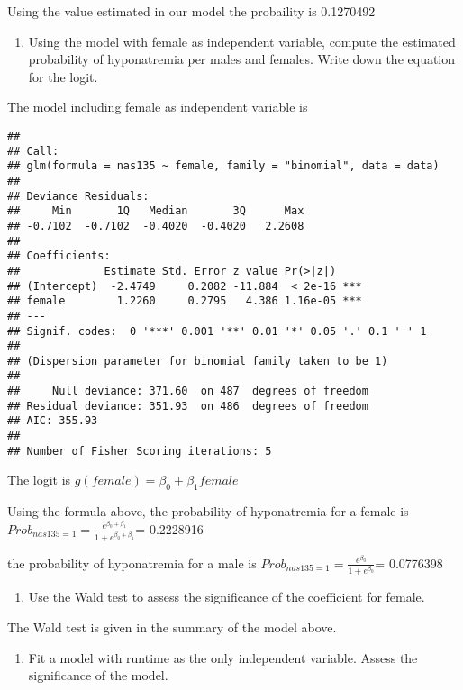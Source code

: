 \documentclass[]{article}
\begin{document}
Using the value estimated in our model the probaility is 0.1270492

\begin{enumerate}
\def\labelenumi{\alph{enumi}.}
\setcounter{enumi}{4}
\itemsep1pt\parskip0pt
\item
  Using the model with female as independent variable, compute the
  estimated probability of hyponatremia per males and females. Write
  down the equation for the logit.
\end{enumerate}

The model including female as independent variable is

\begin{verbatim}
## 
## Call:
## glm(formula = nas135 ~ female, family = "binomial", data = data)
## 
## Deviance Residuals: 
##     Min       1Q   Median       3Q      Max  
## -0.7102  -0.7102  -0.4020  -0.4020   2.2608  
## 
## Coefficients:
##             Estimate Std. Error z value Pr(>|z|)    
## (Intercept)  -2.4749     0.2082 -11.884  < 2e-16 ***
## female        1.2260     0.2795   4.386 1.16e-05 ***
## ---
## Signif. codes:  0 '***' 0.001 '**' 0.01 '*' 0.05 '.' 0.1 ' ' 1
## 
## (Dispersion parameter for binomial family taken to be 1)
## 
##     Null deviance: 371.60  on 487  degrees of freedom
## Residual deviance: 351.93  on 486  degrees of freedom
## AIC: 355.93
## 
## Number of Fisher Scoring iterations: 5
\end{verbatim}

The logit is $g(female)=\beta_0+\beta_1female$

Using the formula above, the probability of hyponatremia for a female is
$Prob_{nas135=1}=\frac{e^{\beta_0+\beta_1}}{1+e^{\beta_0+\beta_1}}$=
0.2228916

the probability of hyponatremia for a male is
$Prob_{nas135=1}=\frac{e^{\beta_0}}{1+e^{\beta_0}}$= 0.0776398

\begin{enumerate}
\def\labelenumi{\alph{enumi}.}
\setcounter{enumi}{5}
\itemsep1pt\parskip0pt
\item
  Use the Wald test to assess the significance of the coefficient for
  female.
\end{enumerate}

The Wald test is given in the summary of the model above.

\begin{enumerate}
\def\labelenumi{\alph{enumi}.}
\setcounter{enumi}{6}
\itemsep1pt\parskip0pt
\item
  Fit a model with runtime as the only independent variable. Assess the
  significance of the model.
\end{enumerate}
\end{document}
